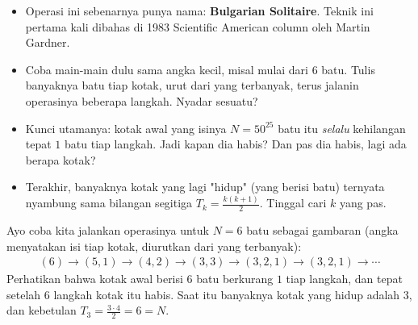 
\begin{remark*}

\begin{itemize}
    \item Operasi ini sebenarnya punya nama: \textbf{Bulgarian Solitaire}. Teknik ini pertama kali dibahas di 1983 Scientific American column oleh Martin Gardner.
    \item Coba main-main dulu sama angka kecil, misal mulai dari $6$ batu. Tulis banyaknya batu tiap kotak, urut dari yang terbanyak, terus jalanin operasinya beberapa langkah. Nyadar sesuatu?
    \item Kunci utamanya: kotak awal yang isinya $N=50^{25}$ batu itu \emph{selalu} kehilangan tepat $1$ batu tiap langkah. Jadi kapan dia habis? Dan pas dia habis, lagi ada berapa kotak?
    \item Terakhir, banyaknya kotak yang lagi "hidup" (yang berisi batu) ternyata nyambung sama bilangan segitiga $T_k = \tfrac{k(k+1)}{2}$. Tinggal cari $k$ yang pas.
\end{itemize}


Ayo coba kita jalankan operasinya untuk $N=6$ batu sebagai gambaran (angka menyatakan isi tiap kotak, diurutkan dari yang terbanyak):
\begin{align*}
    (6) \to (5,1) \to (4,2) \to (3,3) \to (3,2,1) \to (3,2,1) \to \cdots
\end{align*}
Perhatikan bahwa kotak awal berisi $6$ batu berkurang $1$ tiap langkah, dan tepat setelah $6$ langkah kotak itu habis. Saat itu banyaknya kotak yang hidup adalah $3$, dan kebetulan $T_3 = \tfrac{3\cdot 4}{2} = 6 = N$.
\end{remark*}
